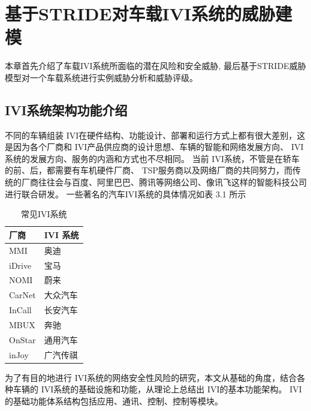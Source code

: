 \chapter{基于STRIDE对车载IVI系统的威胁建模}
\label{ch3}
本章首先介绍了车载IVI系统所面临的潜在风险和安全威胁, 最后基于STRIDE威胁模型对一个车载系统进行实例威胁分析和威胁评级。

\section{IVI系统架构功能介绍}

不同的车辆组装 IVI在硬件结构、功能设计、部署和运行方式上都有很大差别，这是因为各个厂商和 IVI产品供应商的设计思想、车辆的智能和网络发展方向、 IVI系统的发展方向、服务的内涵和方式也不尽相同。
当前 IVI系统，不管是在轿车的前、后，都需要有车机硬件厂商、 TSP服务商以及网络厂商的共同努力，而传统的厂商往往会与百度、阿里巴巴、腾讯等网络公司、像讯飞这样的智能科技公司进行联合研发。
一些著名的汽车IVI系统的具体情况如表 3.1 所示
\begin{table}
  \caption{常见IVI系统}
\begin{center}
  \begin{tabular}{|l|l|}
    \hline 厂商 & IVI 系统 \\
    \hline MMI & 奥迪 \\
    \hline iDrive & 宝马 \\
    \hline NOMI & 蔚来 \\
    \hline CarNet & 大众汽车 \\
    \hline InCall & 长安汽车 \\
    \hline MBUX & 奔驰 \\
    \hline OnStar & 通用汽车 \\
    \hline inJoy & 广汽传祺 \\
    \hline
    \end{tabular}
\end{center}
\end{table}
为了有目的地进行 IVI系统的网络安全性风险的研究，本文从基础的角度，结合各种车辆的 IVI系统的基础设施和功能，从理论上总结出 IVI的基本功能架构。
IVI的基础功能体系结构包括应用、通讯、控制、控制等模块。

